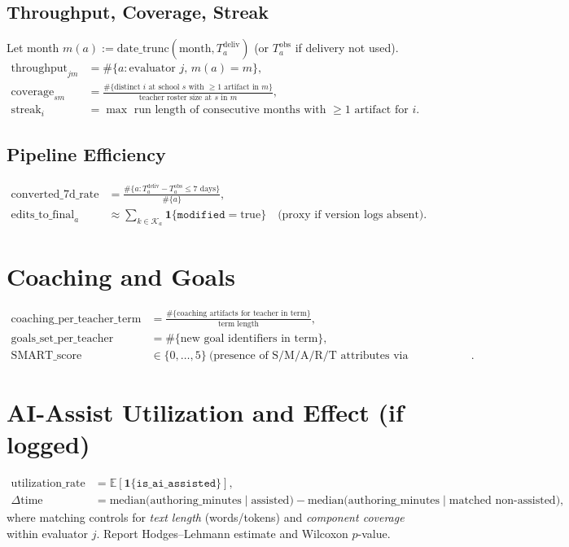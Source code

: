 \documentclass[11pt]{article}
\newcommand{\E}{\mathbb{E}}
\begin{document}
\subsection{Throughput, Coverage, Streak}
Let month $m(a) := \mathrm{date\_trunc}(\mathrm{month}, T^{\mathrm{deliv}}_a)$ (or $T^{\mathrm{obs}}_a$ if delivery not used).
\begin{align}
\mathrm{throughput}_{j m} &= \#\{a: \text{evaluator } j,\, m(a)=m\},\\
\mathrm{coverage}_{s m} &= \frac{\#\{\text{distinct } i \text{ at school } s \text{ with } \ge 1 \text{ artifact in } m\}}{\text{teacher roster size at } s \text{ in } m},\\
\mathrm{streak}_i &= \max \text{ run length of consecutive months with } \ge 1 \text{ artifact for } i.
\end{align}

\subsection{Pipeline Efficiency}
\begin{align}
\mathrm{converted\_7d\_rate} &= \frac{\#\{a: T^{\mathrm{deliv}}_a - T^{\mathrm{obs}}_a \le 7 \text{ days}\}}{\#\{a\}},\\
\mathrm{edits\_to\_final}_a &\approx \sum_{k \in \mathcal{K}_a} \mathbf{1}\{\texttt{modified}= \text{true}\} \quad \text{(proxy if version logs absent)}.
\end{align}

\section{Coaching and Goals}
\begin{align}
\mathrm{coaching\_per\_teacher\_term} &= \frac{\#\{\text{coaching artifacts for teacher in term}\}}{\text{term length}},\\
\mathrm{goals\_set\_per\_teacher} &= \#\{\text{new goal identifiers in term}\},\\
\mathrm{SMART\_score} &\in \{0,\dots,5\}\ \text{(presence of S/M/A/R/T attributes via rules/classifier)}.
\end{align}

\section{AI-Assist Utilization and Effect (if logged)}
\begin{align}
\mathrm{utilization\_rate} &= \E[\mathbf{1}\{\texttt{is\_ai\_assisted}\}],\\
\Delta \mathrm{time} &= \mathrm{median}\bigl(\mathrm{authoring\_minutes}\mid \mathrm{assisted}\bigr) - 
\mathrm{median}\bigl(\mathrm{authoring\_minutes}\mid \text{matched non-assisted}\bigr),
\end{align}
where matching controls for \emph{text length} (words/tokens) and \emph{component coverage} within evaluator $j$. Report Hodges--Lehmann estimate and Wilcoxon $p$-value.
\end{document}
